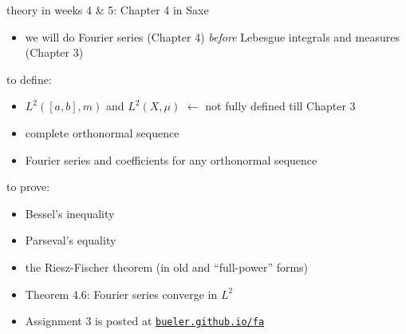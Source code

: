 \documentclass[10pt,
               svgnames,
               hyperref={colorlinks,
                         citecolor=DeepPink4,
                         linkcolor=FireBrick,
                         urlcolor=blue},
               usepdftitle=false]{beamer}
\begin{document}
\begin{frame}{theory in weeks 4 \& 5: Chapter 4 in Saxe}

\begin{itemize}
\item we will do Fourier series (Chapter 4) \emph{before} Lebesgue integrals and measures (Chapter 3)
\end{itemize}

\begin{block}{to define:}
\begin{itemize}
\item $L^2([a,b],m)$ and $L^2(X,\mu)$ \hfill \alert{$\longleftarrow$ not fully defined till Chapter 3}
\item complete orthonormal sequence
\item Fourier series and coefficients for any orthonormal sequence
\end{itemize}
\end{block}

\begin{block}{to prove:}
\begin{itemize}
\item Bessel's inequality
\item Parseval's equality
\item the Riesz-Fischer theorem (in old and ``full-power'' forms)
\item Theorem 4.6: Fourier series converge in $L^2$
\end{itemize}
\end{block}

\begin{itemize}
\item Assignment 3 is posted at \quad  \href{https://bueler.github.io/fa/index.html}{\texttt{bueler.github.io/fa}}
\end{itemize}
\end{frame}
\end{document}
